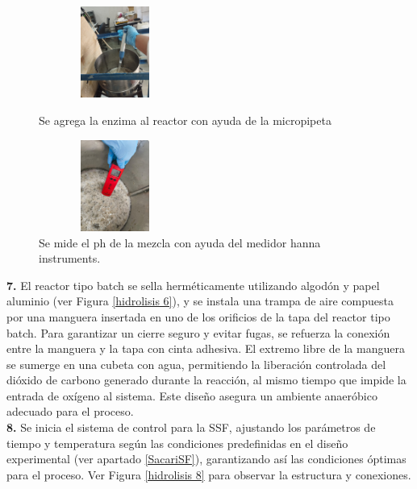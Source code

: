 \documentclass[12pt]{article}
\begin{document}
	     \begin{figure}[H]
	     	\centering
	     	\begin{minipage}{0.46\textwidth}
	     		\centering
	     		\includegraphics[width=5cm, height=3cm]{imagenes/hidrolisis9} %
	     		\caption{ Se agrega la enzima al reactor con ayuda de la micropipeta }
	     		\label{hidrolisis9}
	     	\end{minipage}
	     	\hfill
	     	\begin{minipage}{0.48\textwidth}
	     		\centering
	     		\includegraphics[width=5cm, height=3cm]{imagenes/hidrolisis3 } %
	     		\caption{ Se mide el ph de la mezcla con ayuda del medidor hanna instruments.}
	     		\label{hidrolisis3}
	     	\end{minipage}
	     \end{figure}
	     
	      \textbf{7.} El reactor tipo batch se sella herméticamente utilizando algodón y papel aluminio (ver Figura \ref{hidrolisis 6}), y se instala una trampa de aire compuesta por una manguera insertada en uno de los orificios de la tapa del reactor tipo batch. Para garantizar un cierre seguro y evitar fugas, se refuerza la conexión entre la manguera y la tapa con cinta adhesiva. El extremo libre de la manguera se sumerge en una cubeta con agua, permitiendo la liberación controlada del dióxido de carbono generado durante la reacción, al mismo tiempo que impide la entrada de oxígeno al sistema. Este diseño asegura un ambiente anaeróbico adecuado para el proceso.
	      \\[0.5em]
	     
	     	\textbf{8.} Se inicia el sistema de control para la SSF, ajustando los parámetros de tiempo y temperatura según las condiciones predefinidas en el diseño experimental (ver apartado \ref{SacariSF}), garantizando así las condiciones óptimas para el proceso. Ver Figura \ref{hidrolisis 8} para observar la estructura y conexiones.
	     	
\end{document}
